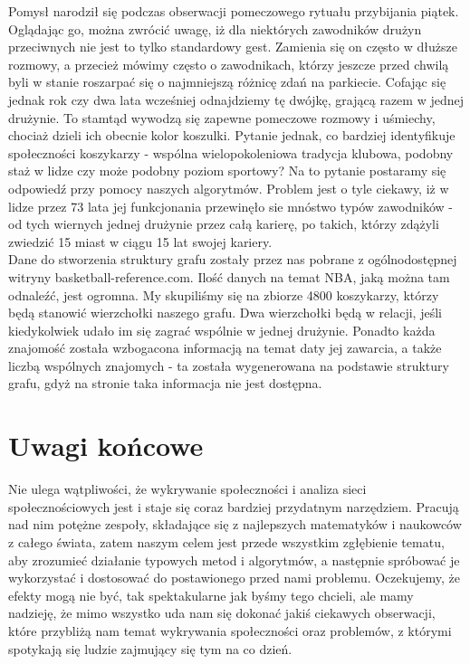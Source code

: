 \documentclass{article}
\begin{document}
Pomysł narodził się podczas obserwacji pomeczowego rytuału przybijania piątek. Oglądając go, można zwrócić uwagę, iż dla niektórych zawodników drużyn przeciwnych nie jest to tylko standardowy gest. Zamienia się on często w dłuższe rozmowy, a przecież mówimy często o zawodnikach, którzy jeszcze przed chwilą byli w stanie roszarpać się o najmniejszą różnicę zdań na parkiecie. Cofając się jednak rok czy dwa lata wcześniej odnajdziemy tę dwójkę, grającą razem w jednej drużynie. To stamtąd wywodzą się zapewne pomeczowe rozmowy i uśmiechy, chociaż dzieli ich obecnie kolor koszulki. Pytanie jednak, co bardziej identyfikuje społeczności koszykarzy - wspólna wielopokoleniowa tradycja klubowa, podobny staż w lidze czy może podobny poziom sportowy? Na to pytanie postaramy się odpowiedź przy pomocy naszych algorytmów. Problem jest o tyle ciekawy, iż w lidze przez 73 lata jej funkcjonania przewinęło sie mnóstwo typów zawodników - od tych wiernych jednej drużynie przez całą karierę, po takich, którzy zdążyli zwiedzić 15 miast w ciągu 15 lat swojej kariery.\\

Dane do stworzenia struktury grafu zostały przez nas pobrane z ogólnodostępnej witryny basketball-reference.com. Ilość danych na temat NBA, jaką można tam odnaleźć, jest ogromna. My skupiliśmy się na zbiorze 4800 koszykarzy, którzy będą stanowić wierzchołki naszego grafu. Dwa wierzchołki będą w relacji, jeśli kiedykolwiek udało im się zagrać wspólnie w jednej drużynie. Ponadto każda znajomość została wzbogacona informacją na temat daty jej zawarcia, a także liczbą wspólnych znajomych - ta została wygenerowana na podstawie struktury grafu, gdyż na stronie taka informacja nie jest dostępna.

\newpage
\section{Uwagi końcowe}


Nie ulega wątpliwości, że wykrywanie społeczności i analiza sieci społecznościowych jest i staje się coraz bardziej przydatnym narzędziem. Pracują nad nim potężne zespoły, składające się z najlepszych matematyków i naukowców z całego świata, zatem naszym celem jest przede wszystkim zgłębienie tematu, aby zrozumieć działanie typowych metod i algorytmów, a następnie spróbować je wykorzystać i dostosować do postawionego przed nami problemu. Oczekujemy, że efekty mogą nie być, tak spektakularne jak byśmy tego chcieli, ale mamy nadzieję, że mimo wszystko uda nam się dokonać jakiś ciekawych obserwacji, które przybliżą nam temat wykrywania społeczności oraz problemów, z którymi spotykają się ludzie zajmujący się tym na co dzień. 

\newpage
\printbibliography
\end{document}

